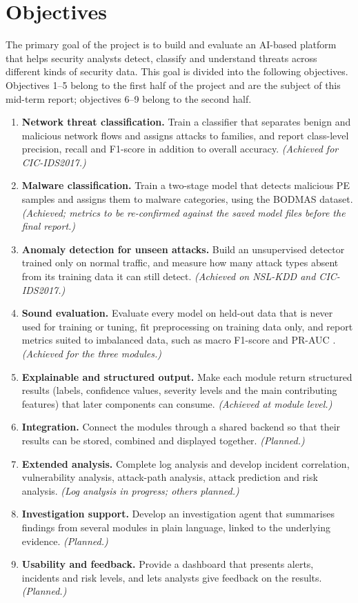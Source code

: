 \section{Objectives}

The primary goal of the project is to build and evaluate an AI-based platform that helps security analysts detect, classify and understand threats across different kinds of security data. This goal is divided into the following objectives. Objectives 1--5 belong to the first half of the project and are the subject of this mid-term report; objectives 6--9 belong to the second half.

\begin{enumerate}[label=\textbf{O\arabic*.}, leftmargin=*, itemsep=2pt, topsep=2pt]
  \item \textbf{Network threat classification.} Train a classifier that separates benign and malicious network flows and assigns attacks to families, and report class-level precision, recall and F1-score in addition to overall accuracy. \textit{(Achieved for CIC-IDS2017.)}
  \item \textbf{Malware classification.} Train a two-stage model that detects malicious PE samples and assigns them to malware categories, using the BODMAS dataset. \textit{(Achieved; metrics to be re-confirmed against the saved model files before the final report.)}
  \item \textbf{Anomaly detection for unseen attacks.} Build an unsupervised detector trained only on normal traffic, and measure how many attack types absent from its training data it can still detect. \textit{(Achieved on NSL-KDD and CIC-IDS2017.)}
  \item \textbf{Sound evaluation.} Evaluate every model on held-out data that is never used for training or tuning, fit preprocessing on training data only, and report metrics suited to imbalanced data, such as macro F1-score and PR-AUC \cite{saito2015pr}. \textit{(Achieved for the three modules.)}
  \item \textbf{Explainable and structured output.} Make each module return structured results (labels, confidence values, severity levels and the main contributing features) that later components can consume. \textit{(Achieved at module level.)}
  \item \textbf{Integration.} Connect the modules through a shared backend so that their results can be stored, combined and displayed together. \textit{(Planned.)}
  \item \textbf{Extended analysis.} Complete log analysis and develop incident correlation, vulnerability analysis, attack-path analysis, attack prediction and risk analysis. \textit{(Log analysis in progress; others planned.)}
  \item \textbf{Investigation support.} Develop an investigation agent that summarises findings from several modules in plain language, linked to the underlying evidence. \textit{(Planned.)}
  \item \textbf{Usability and feedback.} Provide a dashboard that presents alerts, incidents and risk levels, and lets analysts give feedback on the results. \textit{(Planned.)}
\end{enumerate}

